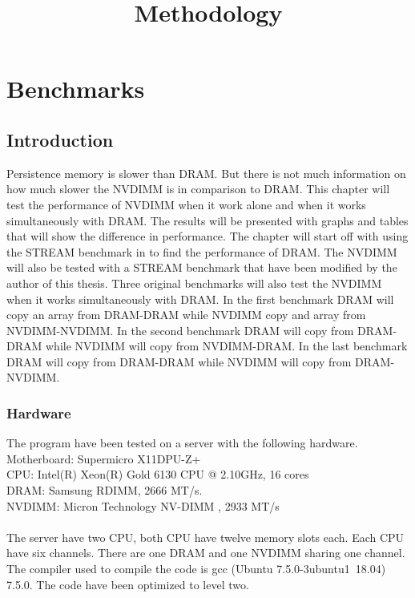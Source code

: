 \documentclass[12pt,a4paper,USenglish]{article}      %
\title{Methodology}  %
\begin{document}
\section{Benchmarks}
\subsection{Introduction}
Persistence memory is slower than DRAM. But there is not much information on how much slower the NVDIMM is in comparison to DRAM. This chapter will test the performance of NVDIMM when it work alone and when it works simultaneously with DRAM. The results will be presented with graphs and tables that will show the difference in performance.
The chapter will start off with using the STREAM\cite{STREAM-c} benchmark in to find the performance of DRAM.
The NVDIMM will also be tested with a STREAM benchmark that have been modified by the author of this thesis. 
Three original benchmarks will also test the NVDIMM when it works simultaneously with DRAM.
In the first benchmark DRAM will copy an array from DRAM-DRAM while NVDIMM copy and array from NVDIMM-NVDIMM. In the second benchmark DRAM will copy from DRAM-DRAM while NVDIMM will copy from NVDIMM-DRAM. In the last benchmark DRAM will copy from DRAM-DRAM while NVDIMM will copy from DRAM-NVDIMM.

\subsubsection{Hardware}
The program have been tested on a server with the following hardware.\\
Motherboard: Supermicro X11DPU-Z+ \\
CPU: Intel(R) Xeon(R) Gold 6130 CPU @ 2.10GHz, 16 cores \\
DRAM: Samsung RDIMM, 2666 MT/s. \\
NVDIMM: Micron Technology NV-DIMM , 2933 MT/s \\
\\
The server have two CPU, both CPU have twelve memory slots each. Each CPU have six channels. There are one DRAM and one NVDIMM sharing one channel.
The compiler used to compile the code is gcc (Ubuntu 7.5.0-3ubuntu1~18.04) 7.5.0. The code have been optimized to level two.
\end{document}
